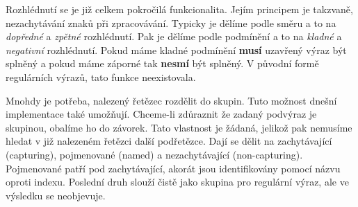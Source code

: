 Rozhlédnutí se je již celkem pokročilá funkcionalita. 
Jejím principem je takzvaně, nezachytávání znaků při zpracovávání.
Typicky je dělíme podle směru a to na \textit{dopředné} a \textit{zpětné} rozhlédnutí.
Pak je dělíme podle podmínění a to na \textit{kladné} a \textit{negativní} rozhlédnutí.
Pokud máme kladné podmínění \textbf{musí} uzavřený výraz být splněný a pokud máme záporné tak \textbf{nesmí} být splněný.
V původní formě regulárních výrazů, tato funkce neexistovala.

Mnohdy je potřeba, nalezený řetězec rozdělit do skupin. 
Tuto možnost dnešní implementace také umožňují.
Chceme-li zdůraznit že zadaný podvýraz je skupinou, obalíme ho do závorek.
Tato vlastnost je žádaná, jelikož pak nemusíme hledat v již nalezeném řetězci další podřetězce.
Dají se dělit na zachytávající (capturing), pojmenované (named) a nezachytávající (non-capturing).
Pojmenované patří pod zachytávající, akorát jsou identifikovány pomocí názvu oproti indexu.
Poslední druh slouží čistě jako skupina pro regulární výraz, ale ve výsledku se neobjevuje.

\endinput

